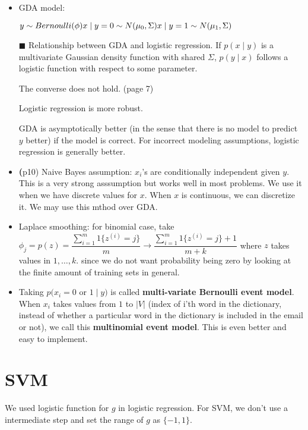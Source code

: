 \documentclass{article}
\theoremstyle{remark}
\begin{document}
\begin{itemize}

\item GDA model:

$y\sim Bernoulli(\phi)\\x\mid y=0\sim N (\mu_0,\Sigma)\\x\mid y=1\sim N(\mu_1, \Sigma)$

    \item[$\blacksquare$] Relationship between GDA and logistic regression.
If $p(x\mid y)$ is a multivariate Gaussian density function with shared $\Sigma$, $p(y\mid x)$ follows a logistic function with respect to some parameter.

The converse does not hold. (page 7)

Logistic regression is more robust.

GDA is asymptotically better (in the sense that there is no model to predict $y$ better) if the model is correct. For incorrect modeling assumptions, logistic regression is generally better.
\item \textbf(p10) {Naive Bayes assumption:} $x_i$'s are conditionally independent given $y$. This is a very strong asssumption but works well in most problems. We use it when we have discrete values for $x$. When $x$ is continuous, we can discretize it. We may use this mthod over GDA.

\item Laplace smoothing: for binomial case, take $\phi_j=p(z)=\dfrac{\sum^m_{i=1}1\{z^{(i)}=j\}}{m}\to\dfrac{\sum^m_{i=1}1\{z^{(i)}=j\}+1}{m+k}$ where $z$ takes values in $1,\dots,k.$ since we do not want probability being zero by looking at the finite amount of training sets in general.
\item Taking $p(x_i=0$ or $1\mid y)$ is called \textbf{multi-variate Bernoulli event model}. When $x_i$ takes values from $1$ to $\lvert V\rvert$ (index of i'th word in the dictionary, instead of whether a particular word in the dictionary is included in the email or not), we call this \textbf{multinomial event model}. This is even better and easy to implement.
\end{itemize}

\section*{SVM}

We used logistic function for $g$ in logistic regression. For SVM, we don't use a intermediate step and set the range of $g$ as $\{-1, 1\}$.
\end{document}

